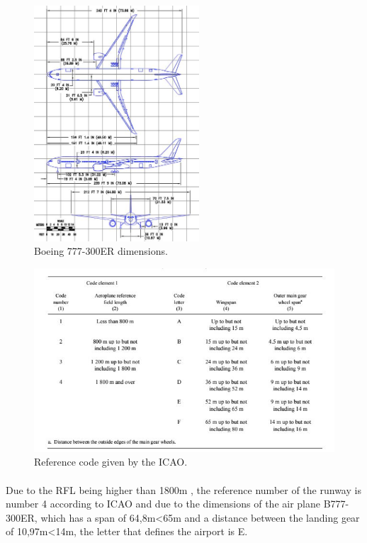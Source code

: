			\begin{figure}[H]
				\centering
				\includegraphics[clip, trim=0cm 0cm 0cm 0cm, width=0.55\textwidth]{./images/B777/Dimensions777}
				\caption{Boeing 777-300ER dimensions.} %
				\label{} %
			\end{figure}
				
			\begin{figure}[H]
				\centering
				\includegraphics[clip, trim=0cm 0cm 0cm 0cm, width=1\textwidth]{./images/Annex14/Referencecode}
				\caption{Reference code given by the ICAO.} %
				\label{} %
			\end{figure}
		
			\paragraph{}Due to the RFL being higher than 1800m , the reference number of the runway is number 4 according to ICAO and due to the dimensions of the air plane B777-300ER, which has a span of 64,8m<65m and a distance between the landing gear of 10,97m<14m, the letter that defines the airport is E.
			

